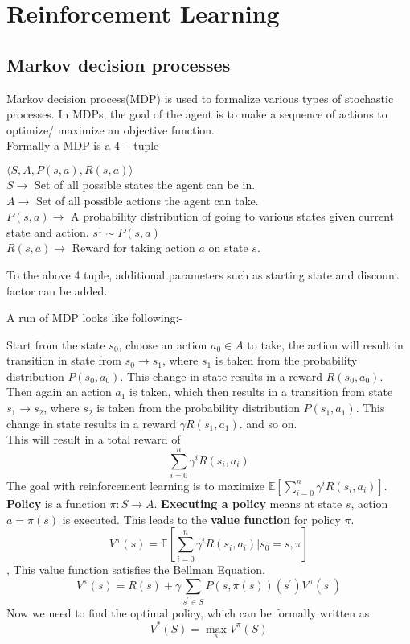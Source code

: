 \section{Reinforcement Learning}
\subsection{Markov decision processes}
\cite{Reinforcement_Learning}Markov decision process(MDP) is used to formalize various types of stochastic processes. In MDPs, the goal of the agent is to make a sequence of actions to optimize/ maximize an objective function. \\
Formally a MDP is a $4-$tuple 
\begin{center}
$\langle S,A,P(s,a),R(s,a) \rangle $\\
$S \to $ Set of all possible states the agent can be in.\\
$A \to $ Set of all possible actions the agent can take.\\
$P(s,a) \to $ A probability distribution of going to various states given current state and action. $s^{1} \sim P(s,a)$\\
$R(s,a) \to $ Reward for taking action $a$ on state $s$.\\
\end{center}
To the above 4 tuple, additional parameters such as starting state and discount factor can be added.
\par A run of MDP looks like following:-
\par Start from the state $s_0$, choose an action $a_0\in A$ to take, the action will result in transition in state from $s_0\rightarrow s_1$, where $s_1$ is taken from the probability distribution $P(s_0,a_0)$. This change in state results in a reward $R(s_0,a_0)$. Then again an action $a_1$ is taken, which then results in a transition from state $s_1\rightarrow s_2$, where $s_2$ is taken from the probability distribution $P(s_1,a_1)$. This change in state results in a reward $\gamma R(s_1,a_1)$. and so on.\\
This will result in a total reward of
$$\sum_{i=0}^{n} \gamma^{i}R(s_i,a_i)$$
The goal with reinforcement learning is to maximize $\mathbb{E}[\sum_{i=0}^{n} \gamma^{i}R(s_i,a_i)]$.\\
\textbf{Policy} is a function $\pi:S\rightarrow A$. \textbf{Executing a policy} means at state $s$, action $a=\pi(s)$ is executed. This leads to the \textbf{value function} for policy $\pi$.
$$V^{\pi}(s)=\mathbb{E}[\sum_{i=0}^{n} \gamma^{i}R(s_i,a_i)|s_0=s,\pi]$$,
This value function satisfies the Bellman Equation.
$$V^{\pi}(s)=R(s)+\gamma\sum_{s^{'}\in S}P(s,\pi(s))(s^{'})V^{\pi}(s^{'})$$ 
Now we need to find the optimal policy, which can be formally written as
$$V^{*}(S)=\max_{\pi}V^{\pi}(S)$$

